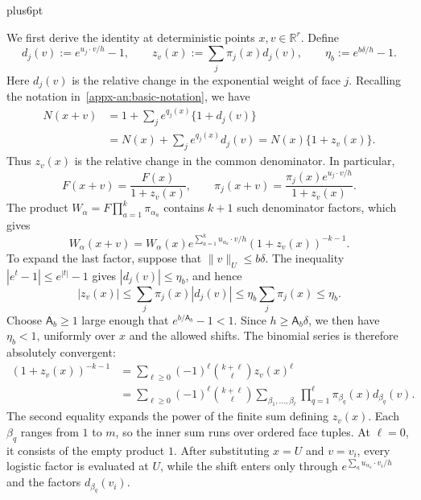 \documentclass[11pt,letterpaper,twoside,leqno]{article}
\makeatletter
\theoremstyle{bookplain}
\theoremstyle{bookremark}
\renewenvironment{proof}[1][\proofname]{\par
  \pushQED{\qed}\normalfont\topsep6pt plus6pt\relax
  \trivlist\item[\hskip\labelsep\bfseries #1\@addpunct{.}]\ignorespaces
}{\popQED\endtrivlist\@endpefalse}
\newcommand{\R}{\mathbb R}
\makeatother
\begin{document}
\begin{proof}
We first derive the identity at deterministic points
$x,v\in\R^r$. Define
\[
 d_j(v):=e^{u_j\cdot v/h}-1,\qquad
 z_v(x):=\sum_j\pi_j(x)d_j(v),\qquad
 \eta_b:=e^{b\delta/h}-1.
\]
Here $d_j(v)$ is the relative change in the exponential weight
of face $j$. Recalling the notation
in~\eqref{appx-an:basic-notation}, we have
\[
 \begin{aligned}
 N(x+v)
 &=1+\sum_j e^{q_j(x)}\{1+d_j(v)\}\\
 &=N(x)+\sum_j e^{q_j(x)}d_j(v)
 =N(x)\{1+z_v(x)\}.
 \end{aligned}
\]
Thus $z_v(x)$ is the relative change in the common denominator.
In particular,
\[
 F(x+v)=\frac{F(x)}{1+z_v(x)},\qquad
 \pi_j(x+v)=\frac{\pi_j(x)e^{u_j\cdot v/h}}{1+z_v(x)}.
\]
The product $W_\alpha=F\prod_{a=1}^k\pi_{\alpha_a}$ contains
$k+1$ such denominator factors, which gives
\begin{equation}
 W_\alpha(x+v)=W_\alpha(x)
 e^{\sum_{a=1}^k u_{\alpha_a}\cdot v/h}
 (1+z_v(x))^{-k-1}.
 \label{eq:weight-translation}
\end{equation}
To expand the last factor, suppose that $\|v\|_U\le b\delta$.
The inequality $|e^t-1|\le e^{|t|}-1$ gives
$|d_j(v)|\le\eta_b$, and hence
\[
 |z_v(x)|\le\sum_j\pi_j(x)|d_j(v)|
             \le\eta_b\sum_j\pi_j(x)\le\eta_b.
\]
Choose $\mathsf A_b\ge1$ large enough that
$e^{b/\mathsf A_b}-1<1$. Since $h\ge\mathsf A_b\delta$,
we then have $\eta_b<1$, uniformly over $x$ and the allowed
shifts. The binomial series is therefore absolutely convergent:
\[
 \begin{aligned}
 (1+z_v(x))^{-k-1}
 &=\sum_{\ell\ge0}(-1)^\ell\binom{k+\ell}{\ell}z_v(x)^\ell\\
 &=\sum_{\ell\ge0}(-1)^\ell\binom{k+\ell}{\ell}
       \sum_{\beta_1,\ldots,\beta_\ell}
       \prod_{q=1}^\ell\pi_{\beta_q}(x)d_{\beta_q}(v).
 \end{aligned}
\]
The second equality expands the power of the finite sum defining
$z_v(x)$. Each $\beta_q$ ranges from $1$ to $m$, so the inner
sum runs over ordered face tuples. At $\ell=0$, it consists of
the empty product $1$. After substituting $x=U$ and $v=v_i$,
every logistic factor is evaluated at $U$, while the shift enters
only through $e^{\sum_a u_{\alpha_a}\cdot v_i/h}$ and the
factors $d_{\beta_q}(v_i)$.


\end{proof}
\end{document}
